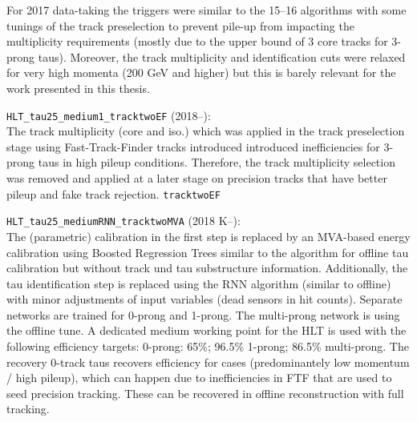 For 2017 data-taking the triggers were similar to the 15--16
algorithms with some tunings of the track preselection to prevent
pile-up from impacting the multiplicity requirements (mostly due to
the upper bound of 3 core tracks for 3-prong taus). Moreover, the
track multiplicity and identification cuts were relaxed for very high
momenta (200 GeV and higher) but this is barely relevant for the work
presented in this thesis.

\vspace{1em}

\verb|HLT_tau25_medium1_tracktwoEF| (2018--):\\
The track multiplicity (core and iso.) which was applied in the track
preselection stage using Fast-Track-Finder tracks introduced
introduced inefficiencies for 3-prong taus in high pileup
conditions. Therefore, the track multiplicity selection was removed
and applied at a later stage on precision tracks that have better
pileup and fake track rejection. \verb|tracktwoEF|

\vspace{1em}

\verb|HLT_tau25_mediumRNN_tracktwoMVA| (2018 K--):\\
The (parametric) calibration in the first step is replaced by an
MVA-based energy calibration using Boosted Regression Trees similar to
the algorithm for offline tau calibration but without track und tau
substructure information. Additionally, the tau identification step is
replaced using the RNN algorithm (similar to offline) with minor
adjustments of input variables (dead sensors in hit counts). Separate
networks are trained for 0-prong and 1-prong.  The multi-prong network
is using the offline tune.  A dedicated medium working point for the
HLT is used with the following efficiency targets: 0-prong: 65\%;
96.5\% 1-prong; 86.5\% multi-prong. The recovery 0-track taus recovers
efficiency for cases (predominantely low momentum / high pileup),
which can happen due to inefficiencies in FTF that are used to seed
precision tracking. These can be recovered in offline reconstruction
with full tracking.


